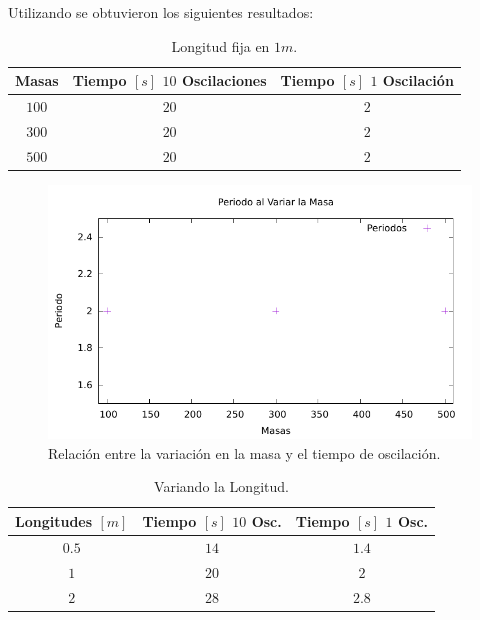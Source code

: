 \documentclass[conference]{IEEEtran}
\begin{document}
    Utilizando \cite{b1} se obtuvieron los siguientes resultados:
    \begin{table}[H]
    	\centering
    	\caption{Longitud fija en $1m$.}
    	\begin{tabular}{||c|c|c||}
    		\hline
    		\hline
				Masas & Tiempo $[s]$ $10$ Oscilaciones & Tiempo $[s]$ $1$ Oscilación \\
    		\hline
    		\hline
    			$100$ & $20$ & $2$ \\
    			$300$ & $20$ & $2$ \\
    			$500$ & $20$ & $2$ \\
    		\hline
    		\hline
    	\end{tabular}
    \end{table}
    
    \begin{figure}[H]
    	\centering
    	\includegraphics[scale=0.5]{graficas/masas.pdf}
    	\caption{Relación entre la variación en la masa y el tiempo de oscilación.}
    \end{figure}
    
    
    
    \begin{table}[H]
    	\centering
    	\caption{Variando la Longitud.}
    	\begin{tabular}{||c|c|c||}
    		\hline
    		\hline
				Longitudes $[m]$ & Tiempo $[s]$ $10$ Osc. & Tiempo $[s]$ $1$ Osc. \\
    		\hline
    		\hline
    			$0.5$ & $14$ & $1.4$ \\
    			$1$ & $20$ & $2$ \\
    			$2$ & $28$ & $2.8$ \\
    		\hline
    		\hline
    	\end{tabular}
    \end{table}
    
\end{document}
